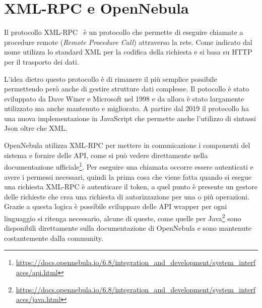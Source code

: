 \section{XML-RPC e OpenNebula}
Il protocollo XML-RPC~\cite{xmlrpc} è un protocollo che permette di eseguire chiamate a procedure remote (\emph{Remote Procedure Call}) attraverso la rete. Come indicato dal nome utilizza lo standard XML per la codifica della richiesta e si basa su HTTP per il trasporto dei dati.\par
L'idea dietro questo protocollo è di rimanere il più semplice possibile permettendo però anche di gestire strutture dati complesse. Il potocollo è stato sviluppato da Dave Winer e Microsoft nel 1998 e da allora è stato largamente utilizzato ma anche mantenuto e migliorato.
A partire dal 2019 il protocollo ha una nuova implementazione in JavaScript che permette anche l'utilizzo di sintassi Json oltre che XML.\par
OpenNebula utilizza XML-RPC per mettere in comunicazione i componenti del sistema e fornire delle API, come si può vedere direttamente nella documentazione ufficiale\footnote{\url{https://docs.opennebula.io/6.8/integration\_and\_development/system\_interfaces/api.html}}. Per eseguire una chiamata occorre essere autenticati e avere i permessi necessari, quindi la prima cosa che viene fatta quando si esegue una richiesta XML-RPC è autenticare il token, a quel punto è presente un gestore delle richieste che crea una richiesta di autorizzazione per una o più operazioni. Grazie a questa logica è possibile sviluppare delle API wrapper per ogni linguaggio si ritenga necessario, alcune di queste, come quelle per Java\footnote{\url{https://docs.opennebula.io/6.8/integration\_and\_development/system\_interfaces/java.html}} sono disponibili direttamente sulla documentazione di OpenNebula e sono mantenute costantemente dalla community.